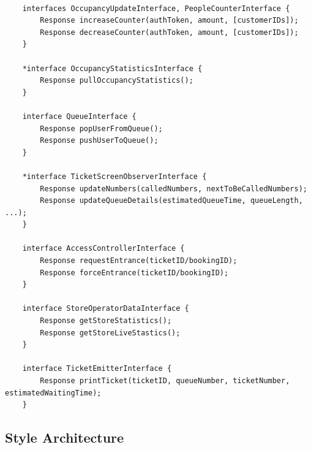 \begin{lstlisting}

    interfaces OccupancyUpdateInterface, PeopleCounterInterface {
        Response increaseCounter(authToken, amount, [customerIDs]);
        Response decreaseCounter(authToken, amount, [customerIDs]);
    }

    *interface OccupancyStatisticsInterface {
        Response pullOccupancyStatistics();
    }

    interface QueueInterface {
        Response popUserFromQueue();
        Response pushUserToQueue();
    }

    *interface TicketScreenObserverInterface {
        Response updateNumbers(calledNumbers, nextToBeCalledNumbers);
        Response updateQueueDetails(estimatedQueueTime, queueLength, ...);
    }

    interface AccessControllerInterface {
        Response requestEntrance(ticketID/bookingID);
        Response forceEntrance(ticketID/bookingID);
    }

    interface StoreOperatorDataInterface {
        Response getStoreStatistics();
        Response getStoreLiveStastics();
    }

    interface TicketEmitterInterface {
        Response printTicket(ticketID, queueNumber, ticketNumber, estimatedWaitingTime);
    }

\end{lstlisting}


\subsection{Style Architecture}

